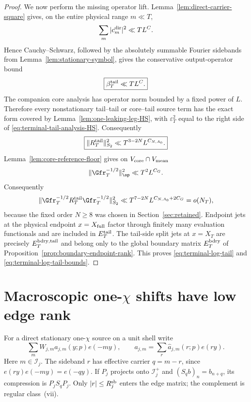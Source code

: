 \begin{proof}
We now perform the missing operator lift. Lemma~\ref{lem:direct-carrier-square}
gives, on the entire physical range $m\ll T$,
\[
\sum_m|c_m^{\rm dir}|^2\ll TL^C.
\]
Hence Cauchy--Schwarz, followed by the absolutely summable Fourier sidebands
from Lemma~\ref{lem:stationary-symbol}, gives the conservative output-operator
bound
\begin{equation}
\boxed{
\beta_T^{\rm tail}\ll TL^C.
}
\label{eq:terminal-tail-source-operator}
\end{equation}
The companion core analysis has operator norm bounded by a fixed power of
$L$. Therefore every nonstationary tail--tail or core--tail source term has the
exact form covered by Lemma~\ref{lem:one-leaking-leg-HS}, with
$\varepsilon_T^2$ equal to the right side of
\eqref{eq:terminal-tail-analysis-HS}. Consequently
\begin{equation}
\boxed{
\|R_T^{\rm tail}\|_{S_2}^2
\ll T^{3-2N}L^{C_{N,A_0}}.
}
\label{eq:terminal-tail-absolute-HS}
\end{equation}
Lemma~\ref{lem:core-reference-floor} gives on
$V_{\rm core}\cap V_{\rm mean}$
\[
\|\Gfr_T^{-1/2}\|_{\op}^2\ll T^2L^{C_G}.
\]
Consequently
\[
\|\Gfr_T^{-1/2}R_T^{\rm tail}\Gfr_T^{-1/2}\|_{S_2}^2
\ll T^{7-2N}L^{C_{N,A_0}+2C_G}=o(N_T),
\]
because the fixed order $N\ge8$ was chosen in
Section~\ref{sec:retained}. Endpoint jets at the physical endpoint
$x=X_{\rm full}$ factor through finitely many evaluation functionals and are
included in $E_T^{\rm tail}$. The tail-side split jets at $x=X_T$ are precisely
$E_T^{\rm bdry,tail}$ and belong only to the global boundary matrix
$E_T^{\rm bdry}$ of Proposition~\ref{prop:boundary-endpoint-rank}. This proves
\eqref{eq:terminal-log-tail} and \eqref{eq:terminal-log-tail-bounds}.
\end{proof}

\section{Macroscopic \texorpdfstring{one-$\chi$}{one-chi} shifts have low edge rank}
\label{sec:edge-rank}

For a direct stationary one-$\chi$ source on a unit shell write
\[
\sum_mW_{j,m}a_{j,m}(y;p)e(-my),\qquad
a_{j,m}=\sum_r\widehat a_{j,m}(r;p)e(ry).
\]
Here $m\in\mathcal I_j$. The sideband $r$ has effective carrier $q=m-r$, since
$e(ry)e(-my)=e(-qy)$. If $P_j$ projects onto $\mathcal I_j^+$ and
$(S_qb)_n=b_{n+q}$, its compression is $P_jS_qP_j$. Only
$|r|\le R_j^{\rm sb}$ enters the edge matrix; the complement is regular
class~(vii).

